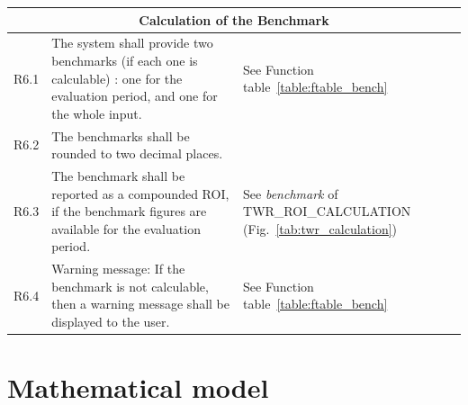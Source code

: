 \documentclass[runningheads,12pt]{article}
\begin{document}
{\begin{longtable}{|l|p{9cm}|p{5cm}|}
\hline
\end{longtable}
\centering
\begin{longtable}{|l|p{9cm}|p{5cm}|}

\hline
\multicolumn{3}{|c|}{\textbf{Calculation of the Benchmark}} \\

\hline
R6.1 & The system shall provide two benchmarks (if each one is calculable) : one for the evaluation period, and one for the whole input. & See Function table~\ref{table:ftable_bench}\\

\hline
R6.2 &  The benchmarks shall be rounded to two decimal places. & \\

\hline
R6.3 & The benchmark shall be reported as a compounded ROI, if the benchmark figures are available for the evaluation period. & See \textit{benchmark} of TWR\_ROI\_CALCULATION (Fig.~\ref{tab:twr_calculation})\\

\hline
R6.4 & Warning message: If the benchmark is not calculable, then a warning message shall be displayed to the user. & See Function table~\ref{table:ftable_bench}\\



\hline
\end{longtable}
}

\newpage

\section{Mathematical model}
\end{document}
